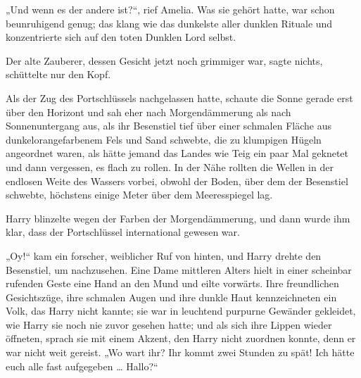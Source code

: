 „Und wenn es der andere ist?“, rief Amelia. Was sie gehört hatte, war schon beunruhigend genug; das klang wie das dunkelste aller dunklen Rituale und konzentrierte sich auf den toten Dunklen Lord selbst.

Der alte Zauberer, dessen Gesicht jetzt noch grimmiger war, sagte nichts, schüttelte nur den Kopf.

\later

Als der Zug des Portschlüssels nachgelassen hatte, schaute die Sonne gerade erst über den Horizont und sah eher nach Morgendämmerung als nach Sonnenuntergang aus, als ihr Besenstiel tief über einer schmalen Fläche aus dunkelorangefarbenem Fels und Sand schwebte, die zu klumpigen Hügeln angeordnet waren, als hätte jemand das Landes wie Teig ein paar Mal geknetet und dann vergessen, es flach zu rollen. In der Nähe rollten die Wellen in der endlosen Weite des Wassers vorbei, obwohl der Boden, über dem der Besenstiel schwebte, höchstens einige Meter über dem Meeresspiegel lag.

Harry blinzelte wegen der Farben der Morgendämmerung, und dann wurde ihm klar, dass der Portschlüssel international gewesen war.

„Oy!“ kam ein forscher, weiblicher Ruf von hinten, und Harry drehte den Besenstiel, um nachzusehen. Eine Dame mittleren Alters hielt in einer scheinbar rufenden Geste eine Hand an den Mund und eilte vorwärts. Ihre freundlichen Gesichtszüge, ihre schmalen Augen und ihre dunkle Haut kennzeichneten ein Volk, das Harry nicht kannte; sie war in leuchtend purpurne Gewänder gekleidet, wie Harry sie noch nie zuvor gesehen hatte; und als sich ihre Lippen wieder öffneten, sprach sie mit einem Akzent, den Harry nicht zuordnen konnte, denn er war nicht weit gereist.
„Wo wart ihr? Ihr kommt zwei Stunden zu spät! Ich hätte euch alle fast aufgegeben … Hallo?“

